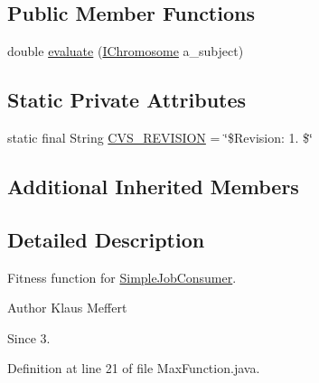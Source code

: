 \subsection*{Public Member Functions}
\begin{DoxyCompactItemize}
\item 
double \hyperlink{classorg_1_1jgap_1_1impl_1_1job_1_1_max_function_a6b0344c8642af9170743d9be9a6509b8}{evaluate} (\hyperlink{interfaceorg_1_1jgap_1_1_i_chromosome}{I\-Chromosome} a\-\_\-subject)
\end{DoxyCompactItemize}
\subsection*{Static Private Attributes}
\begin{DoxyCompactItemize}
\item 
static final String \hyperlink{classorg_1_1jgap_1_1impl_1_1job_1_1_max_function_ae8a3e1c36accdbd1489ced756ca26690}{C\-V\-S\-\_\-\-R\-E\-V\-I\-S\-I\-O\-N} = \char`\"{}\$Revision\-: 1. \$\char`\"{}
\end{DoxyCompactItemize}
\subsection*{Additional Inherited Members}


\subsection{Detailed Description}
Fitness function for \hyperlink{classorg_1_1jgap_1_1impl_1_1job_1_1_simple_job_consumer}{Simple\-Job\-Consumer}.

\begin{DoxyAuthor}{Author}
Klaus Meffert 
\end{DoxyAuthor}
\begin{DoxySince}{Since}
3. 
\end{DoxySince}


Definition at line 21 of file Max\-Function.\-java.



